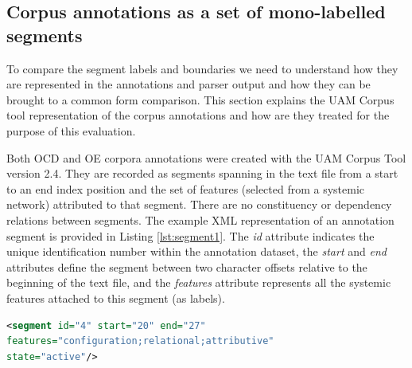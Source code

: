 \subsection{Corpus annotations as a set of mono-labelled segments}

    To compare the segment labels and boundaries we need to understand how they are represented in the annotations and parser output and how they can be brought to a common form comparison. This section explains the UAM Corpus tool representation of the corpus annotations and how are they treated for the purpose of this evaluation.
    
    Both OCD and OE corpora annotations were created with the UAM Corpus Tool \citep{ODonnell2008,ODonnell2008a} version 2.4. They are recorded as segments spanning in the text file from a start to an end index position and the set of features (selected from a systemic network) attributed to that segment. There are no constituency or dependency relations between segments. The example XML representation of an annotation segment is provided in Listing \ref{lst:segment1}. The \textit{id} attribute indicates the unique identification number within the annotation dataset, the \textit{start} and \textit{end} attributes define the segment between two character offsets relative to the beginning of the text file, and the \textit{features} attribute represents all the systemic features attached to this segment (as labels). 

\begin{minipage}{\linewidth}
\begin{lstlisting}[language=XML,basicstyle=\small\tt,frame=single,caption=Segment example in UAM corpus tool,label=lst:segment1]
<segment id="4" start="20" end="27" 
features="configuration;relational;attributive" 
state="active"/>
\end{lstlisting}
\end{minipage}

